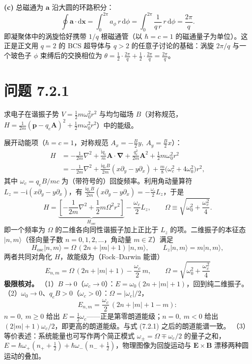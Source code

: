 \textbf{(c)} 总磁通为 $\pmb{a}$ 沿大圆的环路积分：
\begin{equation*}
\oint\pmb{a}\cdot\mathrm{d}\pmb{x}
=\int_0^{2\pi}a_\phi\,r\,\mathrm{d}\phi
=\int_0^{2\pi}\frac{1}{q\,r}\,r\,\mathrm{d}\phi
=\boxed{\frac{2\pi}{q}}.
\end{equation*}
即凝聚体中的涡旋恰好携带 $1/q$ 根磁通管（以 $\hbar=c=1$ 的磁通量子为单位）。这正是正文用 $q=2$ 的 BCS 超导体与 $q>2$ 的任意子讨论的基础：涡旋 $2\pi/q$ 与一个玻色子 $\phi$ 束缚后的交换相位为 $\theta=\tfrac12\cdot\frac{2\pi}{q}+\tfrac12\cdot\frac{2\pi}{q}=\frac{2\pi}{q}$。

\section*{问题 7.2.1}
\begin{problem}
求电子在谐振子势 $V=\frac12m\omega_0^2r^2$ 与均匀磁场 $B$（对称规范，$H=\frac{1}{2m}(\pmb{p}-q_e\pmb{A})^2+\frac12m\omega_0^2r^2$）中的能级。
\end{problem}
\solution
展开动能项（$\hbar=c=1$，对称规范 $A_x=-\frac{B}{2}y,\ A_y=\frac{B}{2}x$）：
\begin{align*}
H&=-\frac{1}{2m}\nabla^2+\frac{\mathrm{i}q_e}{m}\pmb{A}\cdot\pmb{\nabla}
+\frac{q_e^2}{2m}\pmb{A}^2+\frac12m\omega_0^2r^2\\
&=-\frac{1}{2m}\nabla^2+\frac{\mathrm{i}q_eB}{2m}(x\partial_y-y\partial_x)
+\frac{m}{8}\big(\omega_c^2+4\omega_0^2\big)r^2,
\end{align*}
其中 $\omega_c=q_eB/mc$ 为（带符号的）回旋频率。利用角动量算符 $L_z=-\mathrm{i}(x\partial_y-y\partial_x)$，有 $\frac{\mathrm{i}q_eB}{2m}(x\partial_y-y\partial_x)=-\frac{\omega_c}{2}L_z$，于是
\begin{equation*}
H=\underbrace{\left[-\frac{1}{2m}\nabla^2+\frac12m\Omega^2r^2\right]}_{H_{\text{osc}}}
-\frac{\omega_c}{2}L_z,
\qquad
\Omega\equiv\sqrt{\omega_0^2+\frac{\omega_c^2}{4}} .
\end{equation*}
即一个频率为 $\Omega$ 的二维各向同性谐振子加上正比于 $L_z$ 的项。二维振子的本征态 $|n,m\rangle$（径向量子数 $n=0,1,2,\dots$，角动量 $m\in\mathbb Z$）满足
\begin{equation*}
H_{\text{osc}}|n,m\rangle=\Omega\,(2n+|m|+1)\,|n,m\rangle,
\qquad L_z|n,m\rangle=m|n,m\rangle ,
\end{equation*}
两者共同对角化 $H$，故能级为（Fock--Darwin 能谱）
\begin{equation*}
\boxed{\;E_{n,m}=\Omega\,(2n+|m|+1)-\frac{\omega_c}{2}\,m,
\qquad \Omega=\sqrt{\omega_0^2+\frac{\omega_c^2}{4}}\;}
\end{equation*}
\textbf{极限核对。}
（1）$B\to0$（$\omega_c\to0$）：$E=\omega_0(2n+|m|+1)$，回到纯二维振子。
（2）$\omega_0\to0$、$q_eB>0$（$\omega_c>0$）：$\Omega=|\omega_c|/2$，
\begin{equation*}
E_{n,m}=\frac{\omega_c}{2}\,(2n+|m|+1-m):
\end{equation*}
$n=0,\ m\geqslant0$ 给出 $E=\tfrac12\omega_c$——正是第零朗道能级；$n=0,\ m<0$ 给出 $(2|m|+1)\omega_c/2$，即更高的朗道能级。与式 (7.2.1) 之后的朗道能谱一致。
（3）等价表述：系统能量也可写作两个简正模式 $\omega_\pm=\Omega\mp\omega_c/2$ 的量子之和，
$E=\hbar\omega_+(n_++\tfrac12)+\hbar\omega_-(n_-+\tfrac12)$，物理图像为回旋运动与 $\pmb{E}\times\pmb{B}$ 漂移两种圆运动的叠加。

